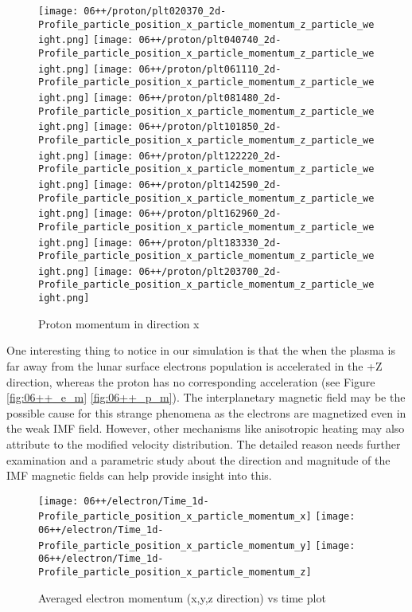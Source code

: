 \begin{figure}
  \centering
  {\texttt{[image: 06++/proton/plt020370\_2d-Profile\_particle\_position\_x\_particle\_momentum\_z\_particle\_weight.png]}}
  {\texttt{[image: 06++/proton/plt040740\_2d-Profile\_particle\_position\_x\_particle\_momentum\_z\_particle\_weight.png]}}
  {\texttt{[image: 06++/proton/plt061110\_2d-Profile\_particle\_position\_x\_particle\_momentum\_z\_particle\_weight.png]}}
  {\texttt{[image: 06++/proton/plt081480\_2d-Profile\_particle\_position\_x\_particle\_momentum\_z\_particle\_weight.png]}}
  {\texttt{[image: 06++/proton/plt101850\_2d-Profile\_particle\_position\_x\_particle\_momentum\_z\_particle\_weight.png]}}
  {\texttt{[image: 06++/proton/plt122220\_2d-Profile\_particle\_position\_x\_particle\_momentum\_z\_particle\_weight.png]}}
  {\texttt{[image: 06++/proton/plt142590\_2d-Profile\_particle\_position\_x\_particle\_momentum\_z\_particle\_weight.png]}}
  {\texttt{[image: 06++/proton/plt162960\_2d-Profile\_particle\_position\_x\_particle\_momentum\_z\_particle\_weight.png]}}
  {\texttt{[image: 06++/proton/plt183330\_2d-Profile\_particle\_position\_x\_particle\_momentum\_z\_particle\_weight.png]}}
  {\texttt{[image: 06++/proton/plt203700\_2d-Profile\_particle\_position\_x\_particle\_momentum\_z\_particle\_weight.png]}}
  \caption{Proton momentum in direction x}\label{fig:06++_p_vz}
\end{figure}

One interesting thing to notice in our simulation is that the when the plasma is far away from the lunar surface electrons population is accelerated in the +Z direction, whereas the proton has no corresponding acceleration (see Figure \ref{fig:06++_e_m} \ref{fig:06++_p_m}). The interplanetary magnetic field may be the possible cause for this strange phenomena as the electrons are magnetized even in the weak IMF field. However, other mechanisms like anisotropic heating may also attribute to the modified velocity distribution. The detailed reason needs further examination and a parametric study about the direction and magnitude of the IMF magnetic fields can help provide insight into this.

\begin{figure}
  \centering
  {\texttt{[image: 06++/electron/Time\_1d-Profile\_particle\_position\_x\_particle\_momentum\_x]}}
  {\texttt{[image: 06++/electron/Time\_1d-Profile\_particle\_position\_x\_particle\_momentum\_y]}}
  {\texttt{[image: 06++/electron/Time\_1d-Profile\_particle\_position\_x\_particle\_momentum\_z]}}
\caption{Averaged electron momentum (x,y,z direction) vs time plot}
\end{figure}

